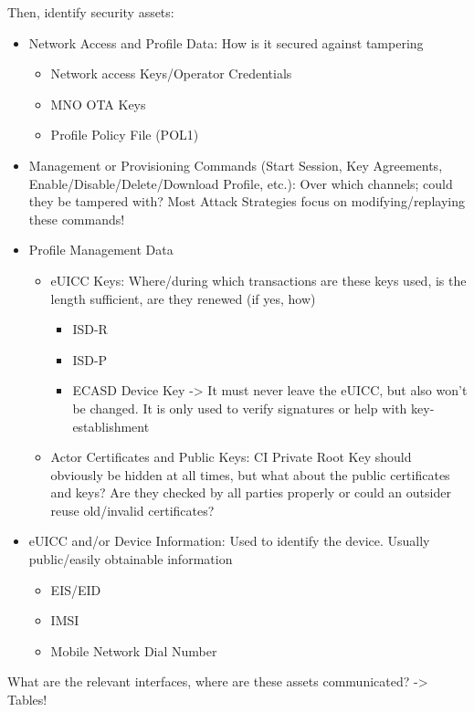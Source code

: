 Then, identify security assets:
\begin{itemize}
    \item Network Access and Profile Data: How is it secured against tampering
    \begin{itemize}
        \item Network access Keys/Operator Credentials
        \item MNO OTA Keys
        \item Profile Policy File (POL1)
    \end{itemize}
    \item Management or Provisioning Commands (Start Session, Key Agreements, Enable/Disable/Delete/Download Profile, etc.): Over which channels; could they be tampered with? Most Attack Strategies focus on modifying/replaying these commands!
    \item Profile Management Data
    \begin{itemize}
        \item eUICC Keys: Where/during which transactions are these keys used, is the length sufficient, are they renewed (if yes, how)
        \begin{itemize}
            \item ISD-R
            \item ISD-P
            \item ECASD Device Key -> It must never leave the eUICC, but also won't be changed. It is only used to verify signatures or help with key-establishment
        \end{itemize}
        \item Actor Certificates and Public Keys: CI Private Root Key should obviously be hidden at all times, but what about the public certificates and keys? Are they checked by all parties properly or could an outsider reuse old/invalid certificates?
    \end{itemize}
    \item eUICC and/or Device Information: Used to identify the device. Usually public/easily obtainable information
    \begin{itemize}
        \item EIS/EID
        \item IMSI
        \item Mobile Network Dial Number
    \end{itemize}
\end{itemize}

What are the relevant interfaces, where are these assets communicated? -> Tables!

